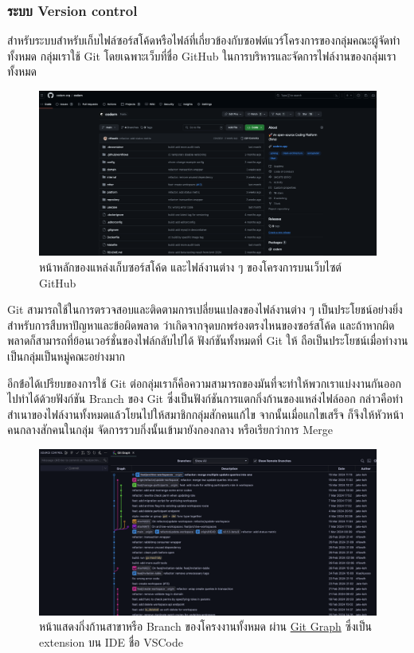 \documentclass[12pt,one side,openright,a4paper]{cpe-thesis-th}
\newcommand{\thaijustify}[1]{%
  \par\hspace{30pt}\justifying
  #1
}
\begin{document}
\subsubsection{ระบบ Version control}
\thaijustify{
  สำหรับระบบสำหรับเก็บไฟล์ซอร์สโค้ดหรือไฟล์ที่เกี่ยวข้องกับซอฟต์แวร์โครงการของกลุ่มคณะผู้จัดทำทั้งหมด กลุ่มเราใช้ Git โดยเฉพาะเว็บที่ชื่อ GitHub ในการบริหารและจัดการไฟล์งานของกลุ่มเราทั้งหมด
}
\begin{figure}[H]
  \centering
  \includegraphics[width=12cm]{figure/results/gh-repo.png}
  \caption[หน้าหลักของแหล่งเก็บไฟล์งานของโครงงานบน GitHub]{หน้าหลักของแหล่งเก็บซอร์สโค้ด และไฟล์งานต่าง ๆ ของโครงการบนเว็บไซต์ GitHub}
  \label{fig:res-gh-repo}
\end{figure}
\thaijustify{
  Git สามารถใช้ในการตรวจสอบและติดตามการเปลี่ยนแปลงของไฟล์งานต่าง ๆ เป็นประโยชน์อย่างยิ่งสำหรับการสืบหาปัญหาและข้อผิดพลาด ว่าเกิดจากจุดบกพร่องตรงไหนของซอร์สโค้ด และถ้าหากผิดพลาดก็สามารถที่ย้อนเวอร์ชั่นของไฟล์กลับไปได้ ฟังก์ชันทั้งหมดที่ Git ให้ ถือเป็นประโยชน์เมื่อทำงานเป็นกลุ่มเป็นหมู่คณะอย่างมาก
}
\thaijustify{
  อีกข้่อได้เปรียบของการใช้ Git ต่อกลุ่มเราก็คือความสามารถของมันที่จะทำให้พวกเราแบ่งงานกันออกไปทำได้ด้วยฟังก์ชัน Branch ของ Git ซึ่งเป็นฟังก์ชันการแตกกิ่งก้านของแหล่งไฟล์ออก กล่าวคือทำสำเนาของไฟล์งานทั้งหมดแล้วโยนไปให้สมาชิกกลุ่มสักคนแก้ไข จากนั้นเมื่อแกไขเสร็จ ก็จึงให้หัวหน้าคนกลางสักคนในกลุ่ม จัดการรวบกิ่งนั้นเข้ามายังกองกลาง หรือเรียกว่าการ Merge
}
\begin{figure}[H]
  \centering
  \includegraphics[width=12cm]{figure/results/gh-graph.png}
  \caption[หน้าแสดงกิ่งก้านสาขาหรือ Branch ของโครงงาน ผ่าน Git บน IDE]{หน้าแสดงกิ่งก้านสาขาหรือ Branch ของโครงงานทั้งหมด ผ่าน \href{https://marketplace.visualstudio.com/items?itemName=mhutchie.git-graph}{Git Graph} ซึ่งเป็น extension บน IDE ชื่อ VSCode}
  \label{fig:res-gh-graph}
\end{figure}
\end{document}
